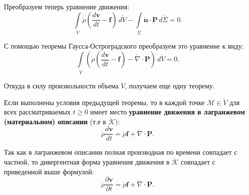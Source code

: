 Преобразуем теперь уравнение движения:
\begin{equation*}
	\int\limits_{\mathring{V}} \mathring{\rho} \left(\frac{d\mathbf{v}}{dt} - \mathbf{f}\right) \, d\mathring{V} - \int\limits_{\mathring{\Sigma}} \mathring{\mathbf{n}} \cdot \mathbf{P} \, d\mathring{\Sigma} = 0. 
\end{equation*}

С помощью теоремы Гаусса-Остроградского преобразуем это уравнение к виду:
\begin{equation*}
	\int\limits_{\mathring{V}} \left(\mathring{\rho} \left(\frac{d\mathbf{v}}{dt} - \mathbf{f}\right) - \mathring{\nabla} \cdot \mathbf{P}\right) \, d\mathring{V} = 0.
\end{equation*}

Откуда в силу произвольности объема $\mathring{V}$, получаем еще одну теорему. 

\begin{theorem*}
	Если выполнены условия предыдущей теоремы, то в каждой точке $\mathcal{M} \in \mathring{V}$ для всех рассматриваемых $t \geqslant 0$ имеет место \textbf{уравнение движения в лагранжевом (материальном) описании} (т.е в $\mathring{\mathcal{K}}$):
	\begin{equation*}
		\mathring{\rho} \frac{d\mathbf{v}}{dt} = \mathring{\rho} \mathbf{f} + \mathring{\nabla} \cdot \mathbf{P}.
	\end{equation*}
	
	Так как в лагранжевом описании полная производная по времени совпадает с частной, то дивергентная форма уравнения движения в $\mathring{\mathcal{K}}$ совпадает с приведенной выше формулой:
	\begin{equation*}
		\mathring{\rho} \frac{\partial\mathbf{v}}{\partial t} = \mathring{\rho} \mathbf{f} + \mathring{\nabla} \cdot \mathbf{P}.
	\end{equation*}
\end{theorem*}